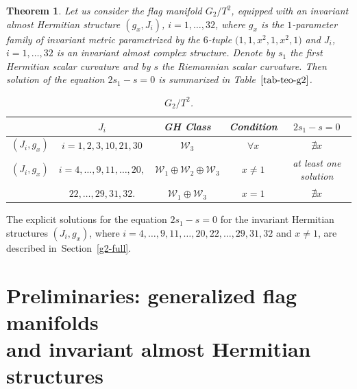 \documentclass[10pt,a4paper]{amsart}
\numberwithin{equation}{section}
\newtheorem{Theorem}{Theorem}[section]
\begin{document}
\begin{Theorem} \label{teo-g2-t2}
Let us consider the flag manifold $G_2/T^2$, equipped with an invariant almost Hermitian structure $(g_x,J_i)$, $i=1,\ldots, 32$, where $g_x$ is the $1$-parameter family of invariant metric parametrized by the $6$-tuple $\big(1,1,x^{2}, 1, x^{2},1 \big)$ and $J_i$, $i=1,\ldots, 32$ is an invariant almost complex structure. Denote by $s_1$ the first Hermitian scalar curvature and by $s$ the Riemannian scalar curvature. Then solution of the equation $2s_1-s=0$ is summarized in Table~$\ref{tab-teo-g2}$.

\begin{table}[h] \setlength{\tabcolsep}{4.5pt}
\renewcommand{\arraystretch}{1.2}
\centering
\caption{$G_2/T^2$.} \label{tab-teo-g2}
\begin{tabular}{c|c|c|c|c}
\hline
 & $J_i$ &GH Class & Condition & $2s_{1}-s=0$ \\
\hline
$(J_{i},g_x)$ & $i=1,2,3,10,21,30$ & $\mathcal{W}_{3}$ & $\forall x$ & $\nexists x$ \\
\hline
$(J_{i},g_x)$ & $i=4,\ldots,9,11,\ldots,20, $ & $\mathcal{W}_{1}\oplus \mathcal{W}_{2}\oplus\mathcal{W}_{3}$ & $x\neq1$ & at least one solution \\
 & $22,\ldots,29,31,32. $ & $\mathcal{W}_{1}\oplus\mathcal{W}_{3}$ & $x=1$ & $\nexists x$ \\
\hline
\end{tabular}
\end{table}
\end{Theorem}

\begin{Remark}
The explicit solutions for the equation $2s_{1}-s=0$ for the invariant Hermitian structures $(J_i,g_x)$, where $i=4,\ldots,9,11,\ldots,20, 22,\ldots,29,31,32$ and $x\neq 1$, are described in~Section~\ref{g2-full}.
\end{Remark}

\section[Preliminaries: generalized flag manifolds and invariant almost Hermitian structures] {Preliminaries: generalized flag manifolds \\and invariant almost Hermitian structures} \label{section-prelim}
\end{document}
